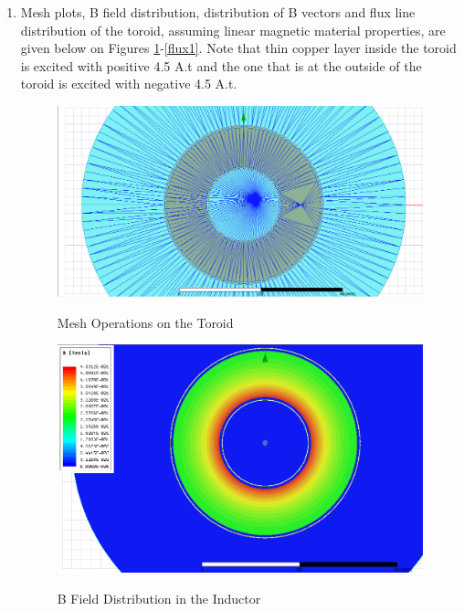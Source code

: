 \begin{enumerate}
\item
Mesh plots, B field distribution, distribution of B vectors and flux line distribution of the toroid, assuming linear magnetic material properties, are given below on Figures \ref{mesh1}-\ref{flux1}. Note that thin copper layer inside the toroid is excited with positive 4.5 A.t and the one that is at the outside of the toroid is excited with negative 4.5 A.t.\\

\begin{figure}[H]
\hspace{1.5cm}
\centering\includegraphics[width=4.5in]{mesh.PNG}\\
\caption{Mesh Operations on the Toroid}
\label{mesh1}
\end{figure} 

\begin{figure}[H]
\hspace{1.5cm}
\centering\includegraphics[width=4.5in]{b_field.PNG}\\
\caption{B Field Distribution in the Inductor}
\label{b1}
\end{figure} 


\end{enumerate}
